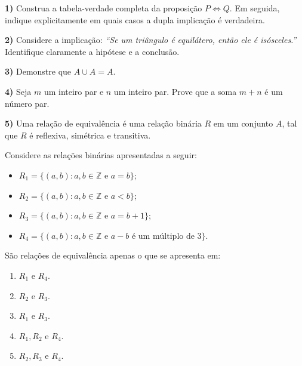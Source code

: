 \documentclass[12pt,a4paper]{article}
\newcommand{\resposta}[1]{
\noindent
\framebox[\textwidth]{
\begin{minipage}{0.98\textwidth}
\vspace{#1}
\end{minipage}
}
}
\begin{document}


\textbf{1)} Construa a tabela-verdade completa da proposição $P \Leftrightarrow Q$. Em seguida, indique explicitamente em quais casos a dupla implicação é verdadeira.

\vspace{0.2cm}
\resposta{8cm}

\vspace{0.8cm}

\textbf{2)} Considere a implicação: \textit{“Se um triângulo é equilátero, então ele é isósceles.”} Identifique claramente a hipótese e a conclusão.

\vspace{0.2cm}
\resposta{3cm}

\vspace{0.8cm}

\textbf{3)} Demonstre que $A \cup A = A$.

\vspace{0.2cm}
\resposta{5cm}
 
\vspace{0.8cm}

\textbf{4)} Seja $m$ um inteiro par e $n$ um inteiro par. Prove que a soma $m+n$ é um número par.

\vspace{0.2cm}
\resposta{4cm}

\vspace{0.8cm}

\textbf{5) } Uma relação de equivalência é uma relação binária $R$ em um conjunto $A$, tal que $R$ é reflexiva, simétrica e transitiva.

Considere as relações binárias apresentadas a seguir:
\begin{itemize}
    \item $R_1 = \{(a, b) : a, b \in \mathbb{Z} \text{ e } a = b\}$;
    \item $R_2 = \{(a, b) : a, b \in \mathbb{Z} \text{ e } a < b\}$;
    \item $R_3 = \{(a, b) : a, b \in \mathbb{Z} \text{ e } a = b + 1\}$;
    \item $R_4 = \{(a, b) : a, b \in \mathbb{Z} \text{ e } a - b \text{ é um múltiplo de 3}\}$.
\end{itemize}

São relações de equivalência apenas o que se apresenta em:
\begin{enumerate}[label=\Alph*)]
    \item $R_1$ e $R_4$.
    \item $R_2$ e $R_3$.
    \item $R_1$ e $R_3$. 
    \item $R_1, R_2$ e $R_4$.
    \item $R_2, R_3$ e $R_4$.
\end{enumerate} 
\end{document}
